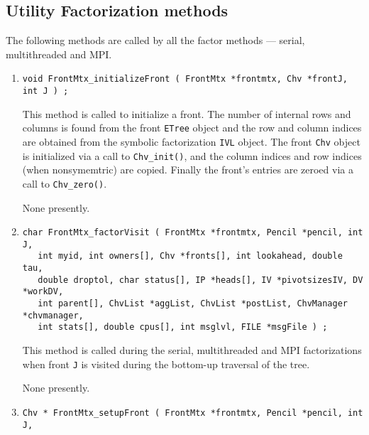 \subsection{Utility Factorization methods}
\label{subsection:FrontMtx:proto:utility-factor}
\par
The following methods are called by all the factor methods
--- serial, multithreaded and MPI.
\par
\begin{enumerate}
\item
\begin{verbatim}
void FrontMtx_initializeFront ( FrontMtx *frontmtx, Chv *frontJ, int J ) ;
\end{verbatim}
This method is called to initialize a front.
The number of internal rows and columns is found from the front
{\tt ETree} object and the row and column indices are obtained 
from the symbolic factorization {\tt IVL} object.
The front {\tt Chv} object is initialized via a call to 
{\tt Chv\_init()}, and the column indices and row indices (when
nonsymemtric) are copied.
Finally the front's entries are zeroed via a call to 
{\tt Chv\_zero()}.
\par {}
None presently.
\item
\begin{verbatim}
char FrontMtx_factorVisit ( FrontMtx *frontmtx, Pencil *pencil, int J,
   int myid, int owners[], Chv *fronts[], int lookahead, double tau,
   double droptol, char status[], IP *heads[], IV *pivotsizesIV, DV *workDV, 
   int parent[], ChvList *aggList, ChvList *postList, ChvManager *chvmanager, 
   int stats[], double cpus[], int msglvl, FILE *msgFile ) ;
\end{verbatim}
This method is called during the serial, multithreaded and MPI
factorizations when front {\tt J} is visited during the bottom-up
traversal of the tree.
\par {}
None presently.
\item
\begin{verbatim}
Chv * FrontMtx_setupFront ( FrontMtx *frontmtx, Pencil *pencil, int J,

\end{verbatim}
\end{enumerate}
